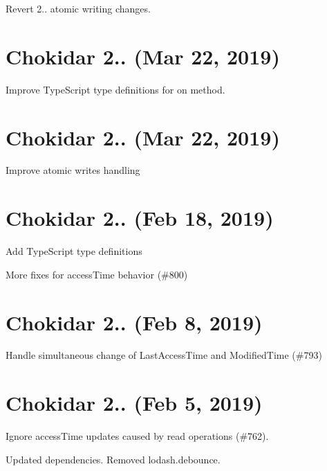 
\begin{DoxyItemize}
\item Revert 2.. atomic writing changes.
\end{DoxyItemize}

\section*{Chokidar 2.. (Mar 22, 2019)}


\begin{DoxyItemize}
\item Improve Type\+Script type definitions for {\ttfamily on} method.
\end{DoxyItemize}

\section*{Chokidar 2.. (Mar 22, 2019)}


\begin{DoxyItemize}
\item Improve atomic writes handling
\end{DoxyItemize}

\section*{Chokidar 2.. (Feb 18, 2019)}


\begin{DoxyItemize}
\item Add Type\+Script type definitions
\item More fixes for access\+Time behavior (\#800)
\end{DoxyItemize}

\section*{Chokidar 2.. (Feb 8, 2019)}


\begin{DoxyItemize}
\item Handle simultaneous change of Last\+Access\+Time and Modified\+Time (\#793)
\end{DoxyItemize}

\section*{Chokidar 2.. (Feb 5, 2019)}


\begin{DoxyItemize}
\item Ignore access\+Time updates caused by read operations (\#762).
\item Updated dependencies. Removed {\ttfamily lodash.\+debounce}.
\end{DoxyItemize}

